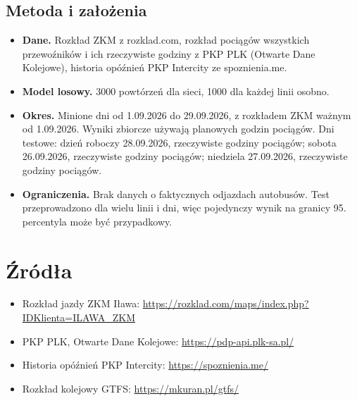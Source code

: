 \documentclass[10pt,a4paper]{article}
\begin{document}
\subsection*{Metoda i założenia}
\begin{itemize}
\item \textbf{Dane.} Rozkład ZKM z rozklad.com, rozkład pociągów wszystkich przewoźników i ich rzeczywiste godziny z PKP PLK (Otwarte Dane Kolejowe), historia opóźnień PKP Intercity ze spoznienia.me.
\item \textbf{Model losowy.} 3000 powtórzeń dla sieci, 1000 dla każdej linii osobno.
\item \textbf{Okres.} Minione dni od 1.09.2026 do 29.09.2026, z rozkładem ZKM ważnym od 1.09.2026. Wyniki zbiorcze używają planowych godzin pociągów. Dni testowe: dzień roboczy 28.09.2026, rzeczywiste godziny pociągów; sobota 26.09.2026, rzeczywiste godziny pociągów; niedziela 27.09.2026, rzeczywiste godziny pociągów.
\item \textbf{Ograniczenia.} Brak danych o faktycznych odjazdach autobusów. Test przeprowadzono dla wielu linii i dni, więc pojedynczy wynik na granicy 95. percentyla może być przypadkowy.
\end{itemize}
\section*{Źródła}
\begin{itemize}
\item Rozkład jazdy ZKM Iława: \url{https://rozklad.com/maps/index.php?IDKlienta=ILAWA_ZKM}
\item PKP PLK, Otwarte Dane Kolejowe: \url{https://pdp-api.plk-sa.pl/}
\item Historia opóźnień PKP Intercity: \url{https://spoznienia.me/}
\item Rozkład kolejowy GTFS: \url{https://mkuran.pl/gtfs/}
\end{itemize}
\end{document}
